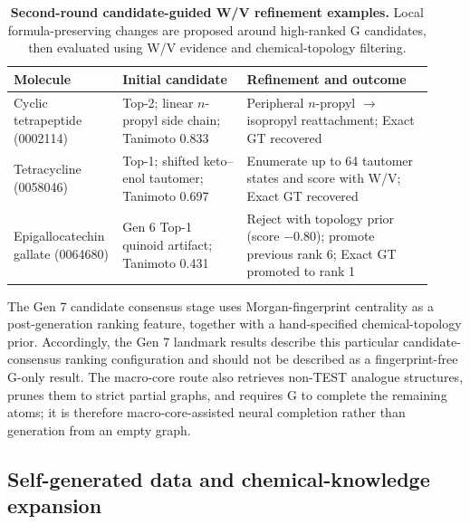 \begin{table}[!htbp]
\centering
\caption{\textbf{Second-round candidate-guided W/V refinement examples.}
Local formula-preserving changes are proposed around high-ranked G candidates,
then evaluated using W/V evidence and chemical-topology filtering.}
\label{tab:second_round_refinement}
\small
\setlength{\tabcolsep}{3pt}
\begin{tabular}{@{}p{0.21\linewidth}p{0.29\linewidth}p{0.42\linewidth}@{}}
\toprule
Molecule & Initial candidate & Refinement and outcome \\
\midrule
Cyclic tetrapeptide (0002114) & Top-2; linear $n$-propyl side chain; Tanimoto 0.833 & Peripheral $n$-propyl $\rightarrow$ isopropyl reattachment; Exact GT recovered \\
Tetracycline (0058046) & Top-1; shifted keto--enol tautomer; Tanimoto 0.697 & Enumerate up to 64 tautomer states and score with W/V; Exact GT recovered \\
Epigallocatechin gallate (0064680) & Gen 6 Top-1 quinoid artifact; Tanimoto 0.431 & Reject with topology prior (score $-0.80$); promote previous rank 6; Exact GT promoted to rank 1 \\
\bottomrule
\end{tabular}
\end{table}

The Gen 7 candidate consensus stage uses Morgan-fingerprint centrality as a
post-generation ranking feature, together with a hand-specified chemical-topology
prior. Accordingly, the Gen 7 landmark results describe this particular
candidate-consensus ranking configuration and should not be described as a
fingerprint-free G-only result. The macro-core route also retrieves non-TEST
analogue structures, prunes them to strict partial graphs, and requires G to
complete the remaining atoms; it is therefore macro-core-assisted neural
completion rather than generation from an empty graph.

\subsection{Self-generated data and chemical-knowledge expansion}

